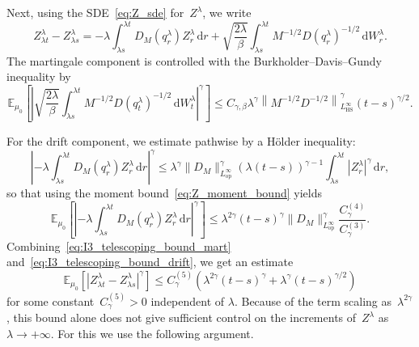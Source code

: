 \documentclass[10pt]{article}
\renewcommand{\d}{\mathrm{d}}
\newcommand{\E}{\mathbb{E}}
\newcommand{\1}{\mathbbm 1}
\begin{document}
Next, using the SDE~\eqref{eq:Z_sde} for~$Z^\lambda$, we write
\begin{equation}
    Z_{\lambda t}^\lambda - Z_{\lambda s}^\lambda = -\lambda\int_{\lambda s}^{\lambda t}D_M(q_r^\lambda) Z_r^\lambda\,\d r + \sqrt{\frac{2\lambda}{\beta}}\int_{\lambda s}^{\lambda t}M^{-1/2}D(q_r^\lambda)^{-1/2}\,\d W_r^\lambda.
\end{equation}
The martingale component is controlled with the Burkholder--Davis--Gundy inequality by
\begin{equation}
    \label{eq:I3_telescoping_bound_mart}
    \E_{\mu_0}\left[\left|\sqrt{\frac{2\lambda}{\beta}}\int_{\lambda s}^{\lambda t}M^{-1/2}D(q_t^\lambda)^{-1/2}\,\d W_t^\lambda\right|^\gamma\right]\leq C_{\gamma,\beta}\lambda^{\gamma}\left\|M^{-1/2}D^{-1/2}\right\|^\gamma_{L^\infty_\mathrm{HS}}(t-s)^{\gamma/2}.
\end{equation}

For the drift component, we estimate pathwise by a H\"older inequality:
\begin{equation}
    \left|-\lambda\int_{\lambda s}^{\lambda t}D_M(q_r^\lambda) Z_r^\lambda\,\d r\right|^\gamma \leq \lambda^\gamma \|D_M\|_{L^\infty_{\mathrm{op}}}^\gamma (\lambda(t-s))^{\gamma -1}\int_{\lambda s}^{\lambda t}|Z_r^\lambda|^\gamma\,\d r, 
\end{equation}
so that using the moment bound~\eqref{eq:Z_moment_bound} yields
\begin{equation}
    \label{eq:I3_telescoping_bound_drift}
    \E_{\mu_0}\left[\left|-\lambda\int_{\lambda s}^{\lambda t}D_M(q_r^\lambda) Z_r^\lambda\,\d r\right|^\gamma\right]\leq \lambda^{2\gamma}(t-s)^\gamma\|D_M\|_{L^\infty_{\mathrm{op}}}^\gamma \frac{C_\gamma^{(4)}}{C_\gamma^{(3)}}.
\end{equation}
Combining~\eqref{eq:I3_telescoping_bound_mart} and~\eqref{eq:I3_telescoping_bound_drift}, we get an estimate
\begin{equation}
    \label{eq:I3_Z_increment_transient}
    \E_{\mu_0}\left[|Z_{\lambda t}^\lambda -Z_{\lambda s}^\lambda|^\gamma\right] \leq C^{(5)}_{\gamma}(\lambda^{2\gamma}(t-s)^\gamma + \lambda^\gamma (t-s)^{\gamma/2})
\end{equation}
for some constant~$C^{(5)}_\gamma>0$ independent of $\lambda$. Because of the term scaling as~$\lambda^{2\gamma}$, this bound alone does not give sufficient control on the increments of~$Z^\lambda$ as~$\lambda\to+\infty$. For this we use the following argument.
\end{document}
